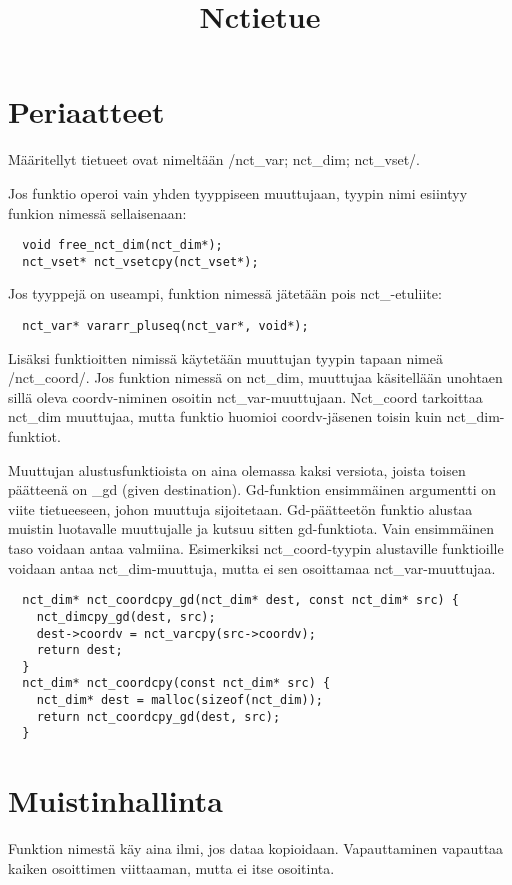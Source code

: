 \documentclass{scrartcl}
\title{Nctietue}
\begin{document}
\maketitle

\section{Periaatteet}
Määritellyt tietueet ovat nimeltään \cinline/nct_var; nct_dim; nct_vset/.

Jos funktio operoi vain yhden tyyppiseen muuttujaan, tyypin nimi esiintyy funkion nimessä sellaisenaan:
\begin{verbatim}
  void free_nct_dim(nct_dim*);
  nct_vset* nct_vsetcpy(nct_vset*);
\end{verbatim}
Jos tyyppejä on useampi, funktion nimessä jätetään pois nct\_-etuliite:
\begin{verbatim}
  nct_var* vararr_pluseq(nct_var*, void*);
\end{verbatim}

Lisäksi funktioitten nimissä käytetään muuttujan tyypin tapaan nimeä \cinline/nct_coord/.
Jos funktion nimessä on nct\_dim, muuttujaa käsitellään unohtaen sillä oleva coordv-niminen osoitin nct\_var-muuttujaan.
Nct\_coord tarkoittaa nct\_dim muuttujaa, mutta funktio huomioi coordv-jäsenen toisin kuin nct\_dim-funktiot.

Muuttujan alustusfunktioista on aina olemassa kaksi versiota, joista toisen päätteenä on \_gd (given destination).
Gd-funktion ensimmäinen argumentti on viite tietueeseen, johon muuttuja sijoitetaan.
Gd-päätteetön funktio alustaa muistin luotavalle muuttujalle ja kutsuu sitten gd-funktiota.
Vain ensimmäinen taso voidaan antaa valmiina.
Esimerkiksi nct\_coord-tyypin alustaville funktioille voidaan antaa nct\_dim-muuttuja, mutta ei sen osoittamaa nct\_var-muuttujaa.
\begin{verbatim}
  nct_dim* nct_coordcpy_gd(nct_dim* dest, const nct_dim* src) {
    nct_dimcpy_gd(dest, src);
    dest->coordv = nct_varcpy(src->coordv);
    return dest;
  }
  nct_dim* nct_coordcpy(const nct_dim* src) {
    nct_dim* dest = malloc(sizeof(nct_dim));
    return nct_coordcpy_gd(dest, src);
  }
\end{verbatim}

\section{Muistinhallinta}
Funktion nimestä käy aina ilmi, jos dataa kopioidaan.
Vapauttaminen vapauttaa kaiken osoittimen viittaaman, mutta ei itse osoitinta.
\end{document}
